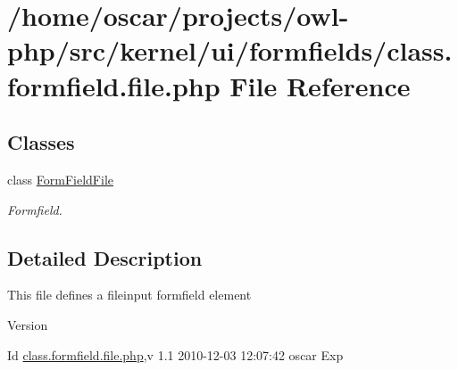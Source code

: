 \section{/home/oscar/projects/owl-\/php/src/kernel/ui/formfields/class.formfield.file.php File Reference}
\label{class_8formfield_8file_8php}
\subsection*{Classes}
\begin{DoxyCompactItemize}
\item 
class \hyperlink{classFormFieldFile}{FormFieldFile}
\begin{DoxyCompactList}\small\item\em Formfield. \item\end{DoxyCompactList}\end{DoxyCompactItemize}


\subsection{Detailed Description}
This file defines a fileinput formfield element \begin{DoxyVersion}{Version}

\end{DoxyVersion}
\begin{DoxyParagraph}{Id}
\hyperlink{class_8formfield_8file_8php}{class.formfield.file.php},v 1.1 2010-\/12-\/03 12:07:42 oscar Exp 
\end{DoxyParagraph}
